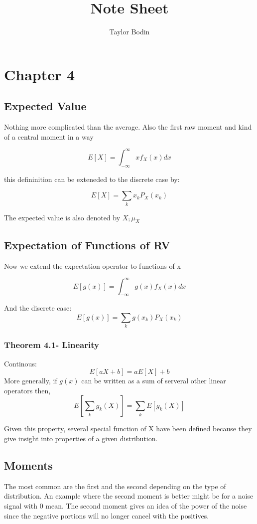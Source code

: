 \documentclass[12pt]{article}
\begin{document}
\title{Note Sheet}
\author{Taylor Bodin}
\maketitle

\section{Chapter 4}

\subsection{Expected Value}
Nothing more complicated than the average. Also the first raw
moment and kind of a central moment in a way

\[E[X] = \int_{-\infty}^\infty xf_X(x)dx\]

this defininition can be exteneded to the discrete case by:

\[E[X] = \sum_k x_k P_X(x_k)\]

The expected value is also denoted by $X\bar, \mu_X$

\subsection{Expectation of Functions of RV}
Now we extend the expectation operator to functions of x

\[E[g(x)] = \int_{-\infty}^\infty g(x)f_X(x)dx\]

And the discrete case:
\[E[g(x)] = \sum_k g(x_k) P_X(x_k)\]

\subsubsection{Theorem 4.1- Linearity}
Continous:
\[E[aX + b] = aE[X] +b\]
More generally, if $g(x)$ can be written as a sum of serveral other
linear operators then,
\[E\left[ \sum_k g_k(X) \right] = \sum_k E[g_k(X)]\]

Given this property, several special function of X have been
defined because they give insight into properties of a given 
distribution.

\subsection{Moments}

The most common are the first and the second depending on the type
of distribution. An example where the second moment is better might
be for a noise signal with 0 mean. The second moment gives an idea
of the power of the noise since the negative portions will no longer
cancel with the positives.
\end{document}
